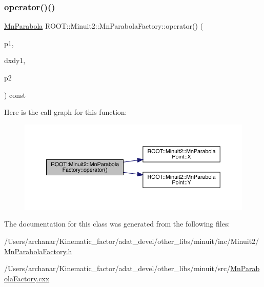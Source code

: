\subsubsection{\texorpdfstring{operator()()}{operator()()}\hspace{0.1cm}{\footnotesize\ttfamily [4/4]}}
{\footnotesize\ttfamily \mbox{\hyperlink{classROOT_1_1Minuit2_1_1MnParabola}{Mn\+Parabola}} R\+O\+O\+T\+::\+Minuit2\+::\+Mn\+Parabola\+Factory\+::operator() (\begin{DoxyParamCaption}\item[{const \mbox{\hyperlink{classROOT_1_1Minuit2_1_1MnParabolaPoint}{Mn\+Parabola\+Point}} \&}]{p1,  }\item[{double}]{dxdy1,  }\item[{const \mbox{\hyperlink{classROOT_1_1Minuit2_1_1MnParabolaPoint}{Mn\+Parabola\+Point}} \&}]{p2 }\end{DoxyParamCaption}) const}

Here is the call graph for this function\+:\nopagebreak
\begin{figure}[H]
\begin{center}
\leavevmode
\includegraphics[width=350pt]{d2/dd8/classROOT_1_1Minuit2_1_1MnParabolaFactory_ab4b6a74b071f4d780dbf6b4663c188b3_cgraph}
\end{center}
\end{figure}


The documentation for this class was generated from the following files\+:\begin{DoxyCompactItemize}
\item 
/\+Users/archanar/\+Kinematic\+\_\+factor/adat\+\_\+devel/other\+\_\+libs/minuit/inc/\+Minuit2/\mbox{\hyperlink{other__libs_2minuit_2inc_2Minuit2_2MnParabolaFactory_8h}{Mn\+Parabola\+Factory.\+h}}\item 
/\+Users/archanar/\+Kinematic\+\_\+factor/adat\+\_\+devel/other\+\_\+libs/minuit/src/\mbox{\hyperlink{MnParabolaFactory_8cxx}{Mn\+Parabola\+Factory.\+cxx}}\end{DoxyCompactItemize}

